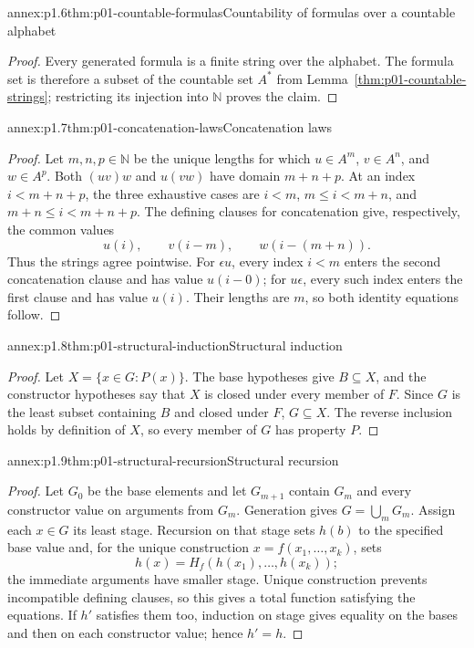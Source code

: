 \begin{annexitem}{annex:p1.6}{thm:p01-countable-formulas}{Countability of formulas over a countable alphabet}
\begin{proof}
Every generated formula is a finite string over the alphabet.  The formula
set is therefore a subset of the countable set \(A^*\) from
Lemma~\ref{thm:p01-countable-strings}; restricting its injection into
\(\mathbb N\) proves the claim.
\end{proof}
\end{annexitem}

\begin{annexitem}{annex:p1.7}{thm:p01-concatenation-laws}{Concatenation laws}
\begin{proof}
Let \(m,n,p\in\mathbb N\) be the unique lengths for which
\(u\in A^m\), \(v\in A^n\), and \(w\in A^p\).  Both
\((uv)w\) and \(u(vw)\) have domain \(m+n+p\).  At an index
\(i<m+n+p\), the three exhaustive cases are
\(i<m\), \(m\leq i<m+n\), and \(m+n\leq i<m+n+p\).  The defining clauses
for concatenation give, respectively, the common values
\[
 u(i),\qquad v(i-m),\qquad w(i-(m+n)).
\]
Thus the strings agree pointwise.  For \(\epsilon u\), every index
\(i<m\) enters the second concatenation clause and has value \(u(i-0)\);
for \(u\epsilon\), every such index enters the first clause and has value
\(u(i)\).  Their lengths are \(m\), so both identity equations follow.
\end{proof}
\end{annexitem}

\begin{annexitem}{annex:p1.8}{thm:p01-structural-induction}{Structural induction}
\begin{proof}
Let \(X=\{x\in G:P(x)\}\).  The base hypotheses give \(B\subseteq X\),
and the constructor hypotheses say that \(X\) is closed under every member
of \(F\).  Since \(G\) is the least subset containing \(B\) and closed under
\(F\), \(G\subseteq X\).  The reverse inclusion holds by definition of
\(X\), so every member of \(G\) has property \(P\).
\end{proof}
\end{annexitem}

\begin{annexitem}{annex:p1.9}{thm:p01-structural-recursion}{Structural recursion}
\begin{proof}
Let \(G_0\) be the base elements and let \(G_{m+1}\) contain \(G_m\) and
every constructor value on arguments from \(G_m\).  Generation gives
\(G=\bigcup_mG_m\).  Assign each \(x\in G\) its least stage.  Recursion on
that stage sets \(h(b)\) to the specified base value and, for the unique
construction \(x=f(x_1,\ldots,x_k)\), sets
\[
 h(x)=H_f(h(x_1),\ldots,h(x_k));
\]
the immediate arguments have smaller stage.  Unique construction prevents
incompatible defining clauses, so this gives a total function satisfying the
equations.  If \(h'\) satisfies them too, induction on stage gives equality
on the bases and then on each constructor value; hence \(h'=h\).
\end{proof}
\end{annexitem}

